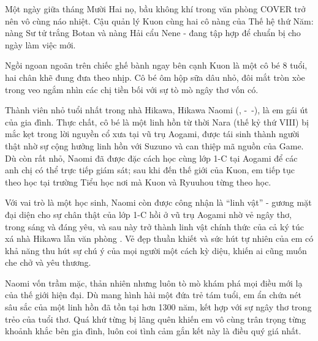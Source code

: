 \documentclass[../main.tex]{subfiles}
\begin{document}

Một ngày giữa tháng Mười Hai nọ, bầu không khí trong văn phòng COVER trở nên vô cùng náo nhiệt. Cậu quản lý Kuon cùng hai cô nàng của Thế hệ thứ Năm: nàng Sư tử trắng Botan và nàng Hải cẩu Nene - đang tập hợp để chuẩn bị cho ngày làm việc mới.

Ngồi ngoan ngoãn trên chiếc ghế bành ngay bên cạnh Kuon là một cô bé 8 tuổi, hai chân khẽ đung đưa theo nhịp. Cô bé ôm hộp sữa dâu nhỏ, đôi mắt tròn xòe trong veo ngắm nhìn các chị tiền bối với sự tò mò ngây thơ vốn có.

\chrint

Thành viên nhỏ tuổi nhất trong nhà Hikawa, Hikawa Naomi (, -\ -), là em gái út của gia đình. Thực chất, cô bé là một linh hồn từ thời Nara (thế kỷ thứ VIII) bị mắc kẹt trong lời nguyền cổ xưa tại vũ trụ Aogami, được tái sinh thành người thật nhờ sự cộng hưởng linh hồn với Suzuno và can thiệp mã nguồn của Game. Dù còn rất nhỏ, Naomi đã được đặc cách học cùng lớp 1-C tại Aogami để các anh chị có thể trực tiếp giám sát; sau khi đến thế giới của Kuon, em tiếp tục theo học tại trường Tiểu học nơi mà Kuon và Ryuuhou từng theo học.

Với vai trò là một học sinh, Naomi còn được công nhận là ``linh vật'' - gương mặt đại diện cho sự chân thật của lớp 1-C hồi ở vũ trụ Aogami nhờ vẻ ngây thơ, trong sáng và đáng yêu, và sau này trở thành linh vật chính thức của cả ký túc xá nhà Hikawa lẫn văn phòng \hll. Vẻ đẹp thuần khiết và sức hút tự nhiên của em có khả năng thu hút sự chú ý của mọi người một cách kỳ diệu, khiến ai cũng muốn che chở và yêu thương.

Naomi vốn trầm mặc, thản nhiên nhưng luôn tò mò khám phá mọi điều mới lạ của thế giới hiện đại. Dù mang hình hài một đứa trẻ tám tuổi, em ẩn chứa nét sâu sắc của một linh hồn đã tồn tại hơn 1300 năm, kết hợp với sự ngây thơ trong trẻo của tuổi thơ. Quá khứ từng bị lãng quên khiến em vô cùng trân trọng từng khoảnh khắc bên gia đình, luôn coi tình cảm gắn kết này là điều quý giá nhất.
\end{document}
